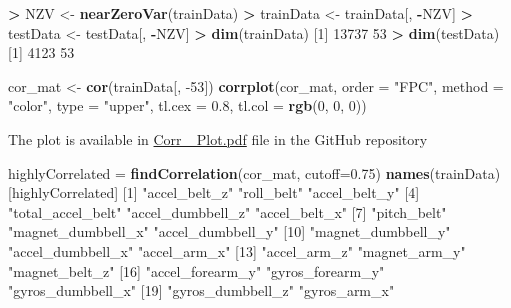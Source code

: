 \documentclass[]{article}
\newenvironment{Shaded}{\begin{snugshade}}{\end{snugshade}}
\newcommand{\DataTypeTok}[1]{\textcolor[rgb]{0.13,0.29,0.53}{#1}}
\newcommand{\DecValTok}[1]{\textcolor[rgb]{0.00,0.00,0.81}{#1}}
\newcommand{\FloatTok}[1]{\textcolor[rgb]{0.00,0.00,0.81}{#1}}
\newcommand{\KeywordTok}[1]{\textcolor[rgb]{0.13,0.29,0.53}{\textbf{#1}}}
\newcommand{\NormalTok}[1]{#1}
\newcommand{\OperatorTok}[1]{\textcolor[rgb]{0.81,0.36,0.00}{\textbf{#1}}}
\newcommand{\StringTok}[1]{\textcolor[rgb]{0.31,0.60,0.02}{#1}}
\begin{document}
\begin{Shaded}
\begin{Highlighting}[]
\OperatorTok{>}\StringTok{ }\NormalTok{NZV <-}\StringTok{ }\KeywordTok{nearZeroVar}\NormalTok{(trainData)}
\OperatorTok{>}\StringTok{ }\NormalTok{trainData <-}\StringTok{ }\NormalTok{trainData[, }\OperatorTok{-}\NormalTok{NZV]}
\OperatorTok{>}\StringTok{ }\NormalTok{testData  <-}\StringTok{ }\NormalTok{testData[, }\OperatorTok{-}\NormalTok{NZV]}
\OperatorTok{>}\StringTok{ }\KeywordTok{dim}\NormalTok{(trainData)}
\NormalTok{[}\DecValTok{1}\NormalTok{] }\DecValTok{13737}    \DecValTok{53}
\OperatorTok{>}\StringTok{ }\KeywordTok{dim}\NormalTok{(testData)}
\NormalTok{[}\DecValTok{1}\NormalTok{] }\DecValTok{4123}   \DecValTok{53}
\end{Highlighting}
\end{Shaded}

\begin{Shaded}
\begin{Highlighting}[]
\NormalTok{cor_mat <-}\StringTok{ }\KeywordTok{cor}\NormalTok{(trainData[, }\DecValTok{-53}\NormalTok{])}
\KeywordTok{corrplot}\NormalTok{(cor_mat, }\DataTypeTok{order =} \StringTok{"FPC"}\NormalTok{, }\DataTypeTok{method =} \StringTok{"color"}\NormalTok{, }\DataTypeTok{type =} \StringTok{"upper"}\NormalTok{,}
\DataTypeTok{tl.cex =} \FloatTok{0.8}\NormalTok{, }\DataTypeTok{tl.col =} \KeywordTok{rgb}\NormalTok{(}\DecValTok{0}\NormalTok{, }\DecValTok{0}\NormalTok{, }\DecValTok{0}\NormalTok{))}
\end{Highlighting}
\end{Shaded}

The plot is available in
\href{https://github.com/sreemoyee13/PracticalMachineLearning/blob/gh-pages/Corr_Plot.pdf}{Corr
\_Plot.pdf} file in the GitHub repository

\begin{Shaded}
\begin{Highlighting}[]
\NormalTok{highlyCorrelated =}\StringTok{ }\KeywordTok{findCorrelation}\NormalTok{(cor_mat, }\DataTypeTok{cutoff=}\FloatTok{0.75}\NormalTok{)}
\KeywordTok{names}\NormalTok{(trainData)[highlyCorrelated]}
\NormalTok{[}\DecValTok{1}\NormalTok{] }\StringTok{"accel_belt_z"}      \StringTok{"roll_belt"}         \StringTok{"accel_belt_y"}     
\NormalTok{ [}\DecValTok{4}\NormalTok{] }\StringTok{"total_accel_belt"}  \StringTok{"accel_dumbbell_z"}  \StringTok{"accel_belt_x"}     
\NormalTok{ [}\DecValTok{7}\NormalTok{] }\StringTok{"pitch_belt"}        \StringTok{"magnet_dumbbell_x"} \StringTok{"accel_dumbbell_y"} 
\NormalTok{[}\DecValTok{10}\NormalTok{] }\StringTok{"magnet_dumbbell_y"} \StringTok{"accel_dumbbell_x"}  \StringTok{"accel_arm_x"}      
\NormalTok{[}\DecValTok{13}\NormalTok{] }\StringTok{"accel_arm_z"}       \StringTok{"magnet_arm_y"}      \StringTok{"magnet_belt_z"}    
\NormalTok{[}\DecValTok{16}\NormalTok{] }\StringTok{"accel_forearm_y"}   \StringTok{"gyros_forearm_y"}   \StringTok{"gyros_dumbbell_x"} 
\NormalTok{[}\DecValTok{19}\NormalTok{] }\StringTok{"gyros_dumbbell_z"}  \StringTok{"gyros_arm_x"}
\end{Highlighting}
\end{Shaded}
\end{document}
